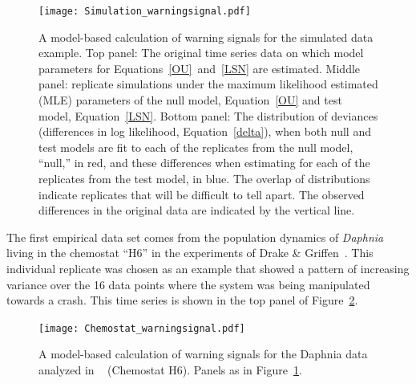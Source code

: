 \documentclass[authoryear,review,11pt]{elsarticle}
\begin{document}
 \begin{figure}
   \begin{center}
     \texttt{[image: Simulation\_warningsignal.pdf]}
     \caption{A model-based calculation of warning signals for the simulated data example.  Top panel: The original time series data on which model parameters for Equations~\eqref{OU}~and~\eqref{LSN} are estimated. Middle panel: replicate simulations under the maximum likelihood estimated (MLE) parameters of the null model, Equation~\eqref{OU} and test model, Equation~\eqref{LSN}.  Bottom panel: The distribution of deviances (differences in log likelihood, Equation~\eqref{delta}), when both null and test models are fit to each of the replicates from the null model, ``null,'' in red, and these differences when estimating for each of the replicates from the test model, in blue.  The overlap of distributions indicate replicates that will be difficult to tell apart.  The observed differences in the original data are indicated by the vertical line.}
     \label{fig:simulation}
  \end{center}
 \end{figure}

The first empirical data set comes from the population dynamics of
\emph{Daphnia} living in the chemostat ``H6'' in the experiments of Drake \& Griffen~\citep{Drake2010}.
This individual replicate was chosen as an example that showed
a pattern of increasing variance over the 16 data points where the system was being manipulated towards a crash.
This time series is shown in the top panel of Figure~\ref{fig:chemostat}.

 \begin{figure}
   \begin{center}
     \texttt{[image: Chemostat\_warningsignal.pdf]}
     \caption{A model-based calculation of warning signals for the Daphnia data analyzed in ~\citet{Drake2010} (Chemostat H6).  
     Panels as in Figure~\ref{fig:simulation}. }
     \label{fig:chemostat}
  \end{center}
 \end{figure}
\end{document}
